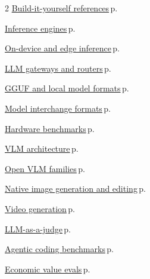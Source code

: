 \documentclass[10pt,a4paper,openany]{report}
\begin{document}
\begin{multicols}{2}
\hyperref[c:training-9]{Build-it-yourself references}\,{\color{muted}\scriptsize p.\,\pageref{c:training-9}}\par\vspace{1pt}
\hyperref[c:inference-0]{Inference engines}\,{\color{muted}\scriptsize p.\,\pageref{c:inference-0}}\par\vspace{1pt}
\hyperref[c:inference-6]{On-device and edge inference}\,{\color{muted}\scriptsize p.\,\pageref{c:inference-6}}\par\vspace{1pt}
\hyperref[c:inference-7]{LLM gateways and routers}\,{\color{muted}\scriptsize p.\,\pageref{c:inference-7}}\par\vspace{1pt}
\hyperref[c:quant-5]{GGUF and local model formats}\,{\color{muted}\scriptsize p.\,\pageref{c:quant-5}}\par\vspace{1pt}
\hyperref[c:hardware-15]{Model interchange formats}\,{\color{muted}\scriptsize p.\,\pageref{c:hardware-15}}\par\vspace{1pt}
\hyperref[c:hardware-16]{Hardware benchmarks}\,{\color{muted}\scriptsize p.\,\pageref{c:hardware-16}}\par\vspace{1pt}
\hyperref[c:vlm-0]{VLM architecture}\,{\color{muted}\scriptsize p.\,\pageref{c:vlm-0}}\par\vspace{1pt}
\hyperref[c:vlm-1]{Open VLM families}\,{\color{muted}\scriptsize p.\,\pageref{c:vlm-1}}\par\vspace{1pt}
\hyperref[c:vlm-8]{Native image generation and editing}\,{\color{muted}\scriptsize p.\,\pageref{c:vlm-8}}\par\vspace{1pt}
\hyperref[c:embodied-6]{Video generation}\,{\color{muted}\scriptsize p.\,\pageref{c:embodied-6}}\par\vspace{1pt}
\hyperref[c:evals-2]{LLM-as-a-judge}\,{\color{muted}\scriptsize p.\,\pageref{c:evals-2}}\par\vspace{1pt}
\hyperref[c:evals-3]{Agentic coding benchmarks}\,{\color{muted}\scriptsize p.\,\pageref{c:evals-3}}\par\vspace{1pt}
\hyperref[c:evals-7]{Economic value evals}\,{\color{muted}\scriptsize p.\,\pageref{c:evals-7}}\par\vspace{1pt}

\end{multicols}
\end{document}
